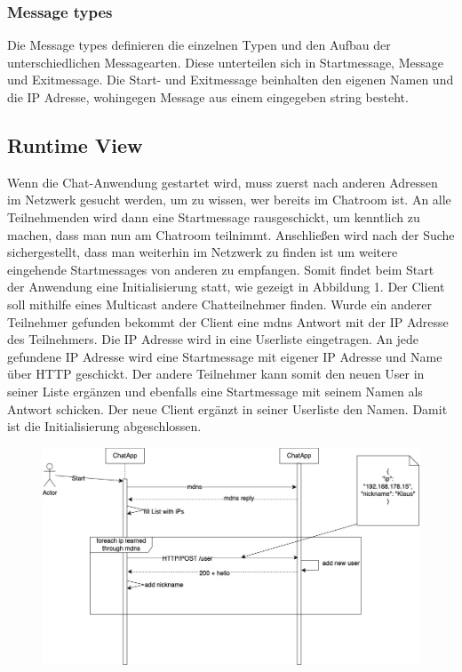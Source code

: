 \subsubsection{Message types}
Die Message types definieren die einzelnen Typen und den Aufbau der unterschiedlichen Messagearten. Diese unterteilen sich in Startmessage, Message und Exitmessage.
Die Start- und Exitmessage beinhalten den eigenen Namen und die IP Adresse, wohingegen Message aus einem eingegeben string besteht.
\subsection{Runtime View}
Wenn die Chat-Anwendung gestartet wird, muss zuerst nach anderen Adressen im Netzwerk gesucht werden, um zu wissen, wer bereits im Chatroom ist.
An alle Teilnehmenden wird dann eine Startmessage rausgeschickt, um kenntlich zu machen, dass man nun am Chatroom teilnimmt. 
Anschließen wird nach der Suche sichergestellt, dass man weiterhin im Netzwerk zu finden ist um weitere eingehende Startmessages von anderen zu empfangen. 
Somit findet beim Start der Anwendung eine Initialisierung statt, wie gezeigt in Abbildung 1.
Der Client soll mithilfe eines Multicast andere Chatteilnehmer finden.
Wurde ein anderer Teilnehmer gefunden bekommt der Client eine mdns Antwort mit der IP Adresse des Teilnehmers.
Die IP Adresse wird in eine Userliste eingetragen. 
An jede gefundene IP Adresse wird eine Startmessage mit eigener IP Adresse und Name über HTTP geschickt. Der andere Teilnehmer kann somit den neuen 
User in seiner Liste ergänzen und ebenfalls eine Startmessage mit seinem Namen als Antwort schicken. Der neue Client ergänzt in seiner Userliste 
den Namen. Damit ist die Initialisierung abgeschlossen. 
\begin{figure}[h]
    \centering
    \includegraphics[scale=0.4]{Images/Initialisierung_Sequenzdiagramm.jpg}
\end{figure} 
